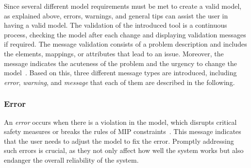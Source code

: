    
    
    Since several different model requirements must be met to create a valid model, as explained above, errors, warnings, and general tips can assist the user in having a valid model. The validation of the introduced tool is a continuous process, checking the model after each change and displaying validation messages if required. The message validation consists of a problem description and includes the elements, mappings, or attributes that lead to an issue. Moreover, the message indicates the acuteness of the problem and the urgency to change the model~\cite{askaripoor2023designer}. Based on
    this, three different message types are introduced, including \textit{error}, \textit{warning}, and \textit{message} that each of them are described in the following. 

    \subsubsection{Error}
      
    An \textit{error} occurs when there is a violation in the model, which disrupts critical safety measures or breaks the rules of MIP constraints~\cite{askaripoor2023designer}. This message indicates that the user needs to adjust the model to fix the error. Promptly addressing such errors is crucial, as they not only affect how well the system works but also endanger the overall reliability of the system.
      
